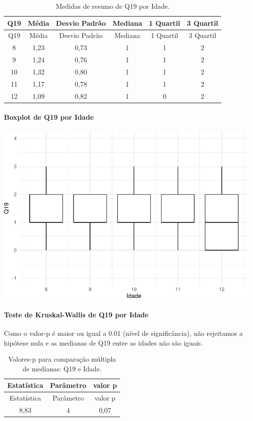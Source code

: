 \documentclass[]{article}
\let\oldparagraph\paragraph
\renewcommand{\paragraph}[1]{\oldparagraph{#1}\mbox{}}
\begin{document}
\begin{longtable}[]{@{}cccccc@{}}
\caption{\label{tab:unnamed-chunk-331}Medidas de resumo de Q19 por Idade.}\tabularnewline
\toprule
Q19 & Média & Desvio Padrão & Mediana & 1 Quartil & 3 Quartil\tabularnewline
\midrule
\endfirsthead
\toprule
Q19 & Média & Desvio Padrão & Mediana & 1 Quartil & 3 Quartil\tabularnewline
\midrule
\endhead
8 & 1,23 & 0,73 & 1 & 1 & 2\tabularnewline
9 & 1,24 & 0,76 & 1 & 1 & 2\tabularnewline
10 & 1,32 & 0,80 & 1 & 1 & 2\tabularnewline
11 & 1,17 & 0,78 & 1 & 1 & 2\tabularnewline
12 & 1,09 & 0,82 & 1 & 0 & 2\tabularnewline
\bottomrule
\end{longtable}

\hypertarget{boxplot-de-q19-por-idade}{%
\paragraph{Boxplot de Q19 por Idade}\label{boxplot-de-q19-por-idade}}

\begin{center}\includegraphics[width=0.75\linewidth]{relatorio_covid19_files/figure-latex/unnamed-chunk-332-1} \end{center}

\hypertarget{teste-de-kruskal-wallis-de-q19-por-idade}{%
\paragraph{Teste de Kruskal-Wallis de Q19 por Idade}\label{teste-de-kruskal-wallis-de-q19-por-idade}}

Como o valor-p é maior ou igual a 0.01 (nível de significância), não rejeitamos a hipótese nula e as medianas de Q19 entre as idades não são iguais.

\begin{longtable}[]{@{}ccc@{}}
\caption{\label{tab:unnamed-chunk-334}Valores-p para comparação múltipla de medianas: Q19 e Idade.}\tabularnewline
\toprule
Estatística & Parâmetro & valor p\tabularnewline
\midrule
\endfirsthead
\toprule
Estatística & Parâmetro & valor p\tabularnewline
\midrule
\endhead
8,83 & 4 & 0,07\tabularnewline
\bottomrule
\end{longtable}
\end{document}
